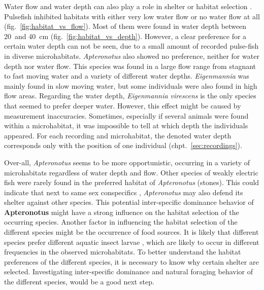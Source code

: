 Water flow and water depth can also play a role in shelter or habitat selection \citep{aadland1993stream}. Pulsefish inhibited habitats with either very low water flow or no water flow at all (fig.~\ref{fig:habitat_vs_flow}).  Most of them were found in water depth between 20~and 40~cm (fig.~\ref{fig:habitat_vs_depth}). However, a clear preference for a certain water depth can not be seen, due to a small amount of recorded pulse-fish in diverse microhabitats.
\textit{Apteronotus} also showed no preference, neither for water depth nor water flow. This species was found in a large flow range from stagnant to fast moving water and a variety of different water depths.
\textit{Eigenmannia} was mainly found in slow moving water, but some individuals were also found in high flow areas. Regarding the water depth, \textit{Eigenmannia virescens} is the only species that seemed to prefer deeper water. However, this effect might be caused by measurement inaccuracies. Sometimes, especially if several animals were found within a microhabitat, it was impossible to tell at which depth the individuals appeared. For each recording and microhabitat, the denoted water depth corresponds only with the position of one individual (chpt.~\ref{sec:recordings}).

Over-all, \textit{Apteronotus} seems to be more opportunistic, occurring in a variety of microhabitats regardless of water depth and flow. Other species of weakly electric fish were rarely found in the preferred habitat of \textit{Apteronotus} (stones). This could indicate that next to same sex conspecifics \citep{raab2019}, \textit{Apteronotus} may also defend its shelter against other species. This potential inter-specific dominance behavior of \textbf{Apteronotus} might have a strong influence on the habitat selection of the occurring  species. Another factor in influencing the habitat selection of the different species might be the occurrence of food sources. It is likely that different species prefer different aquatic insect larvae \citep{marrero1991notas}, which are likely to occur in different frequencies in the observed microhabitats. To better understand the habitat preferences of the different species,  it is necessary to know why certain shelter are selected. Investigating inter-specific dominance and natural foraging behavior of the different species, would be a good next step.



